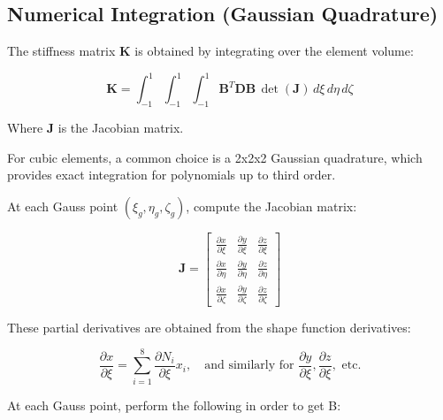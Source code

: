 \documentclass{article}
\begin{document}
\subsection{Numerical Integration (Gaussian Quadrature)}

The stiffness matrix $ \mathbf{K} $ is obtained by integrating over the element volume:

$$
\mathbf{K} = \int_{-1}^{1} \int_{-1}^{1} \int_{-1}^{1} \mathbf{B}^T \mathbf{D} \mathbf{B} \, \det(\mathbf{J}) \, d\xi \, d\eta \, d\zeta
$$

Where $ \mathbf{J} $ is the Jacobian matrix. %

For cubic elements, a common choice is a 2x2x2 Gaussian quadrature, which provides exact integration for polynomials up to third order.

At each Gauss point $ (\xi_g, \eta_g, \zeta_g) $, compute the Jacobian matrix:

$$
\mathbf{J} = 
\begin{bmatrix}
\frac{\partial x}{\partial \xi} & \frac{\partial y}{\partial \xi} & \frac{\partial z}{\partial \xi} \\
\frac{\partial x}{\partial \eta} & \frac{\partial y}{\partial \eta} & \frac{\partial z}{\partial \eta} \\
\frac{\partial x}{\partial \zeta} & \frac{\partial y}{\partial \zeta} & \frac{\partial z}{\partial \zeta} 
\end{bmatrix}
$$

These partial derivatives are obtained from the shape function derivatives:

$$
\frac{\partial x}{\partial \xi} = \sum_{i=1}^{8} \frac{\partial N_i}{\partial \xi} x_i, \quad \text{and similarly for } \frac{\partial y}{\partial \xi}, \frac{\partial z}{\partial \xi}, \text{ etc.}
$$

At each Gauss point, perform the following in order to get B:
\end{document}
